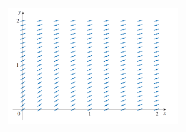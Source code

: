 \documentclass[12pt, a4paper]{article}
\begin{document}
\begin{enumerate}
    \begin{center}
        \begin{figure}[htbp] %
            \centering %
             \includegraphics[width=0.4\textwidth]{graph3.png} %
         \end{figure}
    \end{center}
\end{enumerate}

\hrulefill
\vspace{1em}
\end{document}
